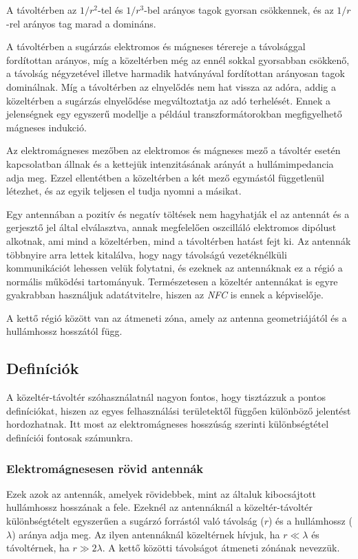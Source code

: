 \documentclass[12pt]{article}
\begin{document}
A távoltérben az ${1}/{r^2}$-tel és ${1}/{r^3}$-bel arányos tagok
gyorsan csökkennek, és az ${1}/{r}$-rel arányos tag marad a domináns.

A távoltérben a sugárzás elektromos és mágneses térereje a 
távolsággal fordítottan arányos, 
míg a közeltérben még az ennél sokkal gyorsabban csökkenő, a távolság négyzetével illetve 
harmadik hatványával fordítottan arányosan tagok dominálnak.
Míg a távoltérben az elnyelődés nem hat vissza az adóra, addig a közeltérben a sugárzás
elnyelődése megváltoztatja az adó terhelését. Ennek a jelenségnek egy egyszerű
modellje a például transzformátorokban megfigyelhető mágneses indukció.

Az elektromágneses mezőben az elektromos és mágneses mező a távoltér esetén kapcsolatban
állnak és a kettejük intenzitásának arányát a hullámimpedancia adja meg. 
Ezzel ellentétben a közeltérben a két mező egymástól függetlenül létezhet, és
az egyik teljesen el tudja nyomni a másikat.

Egy antennában a pozitív és negatív töltések nem hagyhatják el az antennát és a 
gerjesztő jel által elválasztva, annak megfelelően oszcilláló elektromos dipólust
alkotnak, ami mind a közeltérben, mind a távoltérben hatást fejt ki. Az antennák
többnyire arra lettek kitalálva, hogy nagy távolságú vezetéknélküli kommunikációt
lehessen velük folytatni, és ezeknek az antennáknak ez a régió a normális működési
tartományuk. Természetesen a közeltér antennákat is egyre gyakrabban használjuk
adatátvitelre, hiszen az \emph{NFC} is ennek a képviselője.

A kettő régió között van az átmeneti zóna, amely az antenna geometriájától és a 
hullámhossz hosszától függ.

\subsection{Definíciók}
A közeltér-távoltér szóhasználatnál nagyon fontos, hogy tisztázzuk a pontos
definíciókat, hiszen az egyes felhasználási területektől függően különböző
jelentést hordozhatnak. Itt most az elektromágneses hosszúság szerinti különbségtétel
definíciói fontosak számunkra.

\subsubsection{Elektromágnesesen rövid antennák}
Ezek azok az antennák, amelyek rövidebbek, mint az általuk kibocsájtott hullámhossz
hosszának a fele. Ezeknél az antennáknál a közeltér-távoltér különbségtételt egyszerűen
a sugárzó forrástól való távolság ($r$) és a hullámhossz ($\lambda$) aránya adja meg.
Az ilyen antennáknál közeltérnek hívjuk, ha $ r \ll \lambda $ és távoltérnek, ha $ r \gg 2\lambda $.
A kettő közötti távolságot átmeneti zónának nevezzük.
\end{document}
